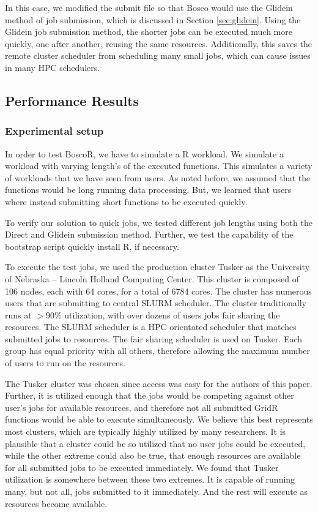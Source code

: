 \documentclass[conference]{IEEEtran}
\begin{document}
In this case, we modified the submit file so that Bosco would use the Glidein method of job submission, which is discussed in Section \ref{sec:glidein}.  Using the Glidein job submission method, the shorter jobs can be executed much more quickly, one after another, reusing the same resources.  Additionally, this saves the remote cluster scheduler from scheduling many small jobs, which can cause issues in many HPC schedulers.


\subsection{Performance Results}

\subsubsection{Experimental setup}  

In order to test BoscoR, we have to simulate a R workload.  We simulate a workload with varying length's of the executed functions.  This simulates a variety of workloads that we have seen from users.  As noted before, we assumed that the functions would be long running data processing.  But, we learned that users where instead submitting short functions to be executed quickly.  

To verify our solution to quick jobs, we tested different job lengths using both the Direct and Glidein submission method.  Further, we test the capability of the bootstrap script quickly install R, if necessary.

To execute the test jobs, we used the production cluster Tusker as the University of Nebraska -- Lincoln Holland Computing Center.  This cluster is composed of 106 nodes, each with 64 cores, for a total of 6784 cores.  The cluster has numerous users that are submitting to central SLURM \cite{yoo2003slurm} scheduler.  The cluster traditionally runs at $>$90\% utilization, with over dozens of users jobs fair sharing the resources.  The SLURM scheduler is a HPC orientated scheduler that matches submitted jobs to resources.  The fair sharing scheduler is used on Tusker.  Each group has equal priority with all others, therefore allowing the maximum number of users to run on the resources.

The Tusker cluster was chosen since access was easy for the authors of this paper.  Further, it is utilized enough that the jobs would be competing against other user's jobs for available resources, and therefore not all submitted GridR functions would be able to execute simultaneously.  We believe this best represents most clusters, which are typically highly utilized by many researchers.  It is plausible that a cluster could be so utilized that no user jobs could be executed, while the other extreme could also be true, that enough resources are available for all submitted jobs to be executed immediately.  We found that Tusker utilization is somewhere between these two extremes.  It is capable of running many, but not all, jobs submitted to it immediately.  And the rest will execute as resources become available.
\end{document}
